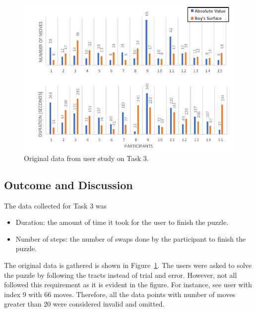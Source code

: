 \documentclass[hyperref, plainreport, noproblem]{cgvpub1}
\begin{document}
\begin{figure}[ht]
    \centering
    \includegraphics[width = 0.9\columnwidth]{orig_data}
    \caption{Original data from user study on Task 3.}
    \label{fig:orig_data}
\end{figure}

\subsection{Outcome and Discussion}

The data collected for Task 3 was 
\begin{itemize}
	\item Duration: the amount of time it took for the user to finish the puzzle.
	\item Number of steps: the number of swaps done by the participant to finish the puzzle.
\end{itemize}

The original data is gathered is shown in Figure~\ref{fig:orig_data}. The users were asked to solve the puzzle by following the tracts instead of trial and error. However, not all followed this requirement as it is evident in the figure. For instance, see user with index 9 with 66 moves. Therefore, all the data points with number of moves greater than 20 were considered invalid and omitted. 
\end{document}
